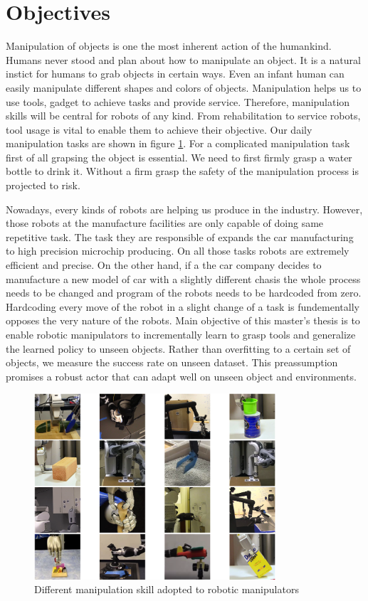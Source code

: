 \section{Objectives}

Manipulation of objects is one the most inherent action of the humankind. Humans never stood and plan about how to manipulate an object. 
It is a natural instict for humans to grab objects in certain ways. Even an infant human can easily manipulate different shapes and colors of objects.
Manipulation helps us to use tools, gadget to achieve tasks and provide service. 
Therefore, manipulation skills will be central for robots of any kind. 
From rehabilitation to service robots, tool usage is vital to enable them to achieve their objective. Our daily manipulation tasks are shown in figure \ref{fig:x manipulation_skills}.
For a complicated manipulation task first of all grapsing the object is essential. We need to first firmly grasp a water bottle to drink it.
Without a firm grasp the safety of the manipulation process is projected to risk. 

Nowadays, every kinds of robots are helping us produce in the industry. However, those robots at the manufacture facilities are only capable of doing same repetitive task. 
The task they are responsible of expands the car manufacturing to high precision microchip producing. On all those tasks robots are extremely efficient and precise. 
On the other hand, if a the car company decides to manufacture a new model of car with a slightly different chasis the whole process needs to be changed and program of the robots needs to be hardcoded from zero.
Hardcoding every move of the robot in a slight change of a task is fundementally opposes the very nature of the robots. 
Main objective of this master's thesis is to enable robotic manipulators to incrementally learn to grasp tools and generalize the learned policy to unseen objects.
Rather than overfitting to a certain set of objects, we measure the success rate on unseen dataset. 
This preassumption promises a robust actor that can adapt well on unseen object and environments.


\begin{figure}[htbp]
    \centering
      \includegraphics[width=0.8\textwidth]{figures/manipulation_skill}
    \caption{Different manipulation skill adopted to robotic manipulators \cite{Kroemer2019}}
    \label{fig:x manipulation_skills}
\end{figure}